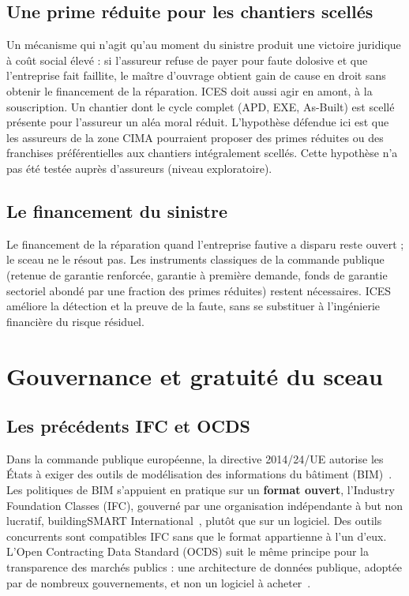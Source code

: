 \documentclass[11pt,a4paper]{article}
\begin{document}
\subsection{Une prime réduite pour les chantiers scellés}

Un mécanisme qui n'agit qu'au moment du sinistre produit une victoire juridique à coût social élevé : si l'assureur refuse de payer pour faute dolosive et que l'entreprise fait faillite, le maître d'ouvrage obtient gain de cause en droit sans obtenir le financement de la réparation. ICES doit aussi agir en amont, à la souscription. Un chantier dont le cycle complet (APD, EXE, As-Built) est scellé présente pour l'assureur un aléa moral réduit. L'hypothèse défendue ici est que les assureurs de la zone CIMA pourraient proposer des primes réduites ou des franchises préférentielles aux chantiers intégralement scellés. Cette hypothèse n'a pas été testée auprès d'assureurs (niveau exploratoire).

\subsection{Le financement du sinistre}\label{sec:financement}

Le financement de la réparation quand l'entreprise fautive a disparu reste ouvert ; le sceau ne le résout pas. Les instruments classiques de la commande publique (retenue de garantie renforcée, garantie à première demande, fonds de garantie sectoriel abondé par une fraction des primes réduites) restent nécessaires. ICES améliore la détection et la preuve de la faute, sans se substituer à l'ingénierie financière du risque résiduel.

\section{Gouvernance et gratuité du sceau}\label{sec:gouvernance}

\subsection{Les précédents IFC et OCDS}

Dans la commande publique européenne, la directive 2014/24/UE autorise les États à exiger des outils de modélisation des informations du bâtiment (BIM)~\cite{eu2014}. Les politiques de BIM s'appuient en pratique sur un \textbf{format ouvert}, l'Industry Foundation Classes (IFC), gouverné par une organisation indépendante à but non lucratif, buildingSMART International~\cite{buildingsmart}, plutôt que sur un logiciel. Des outils concurrents sont compatibles IFC sans que le format appartienne à l'un d'eux. L'Open Contracting Data Standard (OCDS) suit le même principe pour la transparence des marchés publics : une architecture de données publique, adoptée par de nombreux gouvernements, et non un logiciel à acheter~\cite{ocds}.
\end{document}
